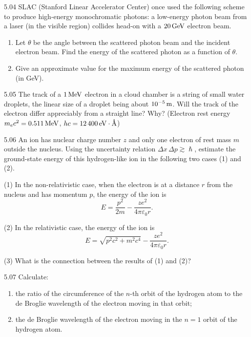 \begin{problem}{5.04}
SLAC (Stanford Linear Accelerator Center) once used the following scheme to produce high-energy monochromatic photons: a low-energy photon beam from a laser (in the visible region) collides head-on with a $20\,\mathrm{GeV}$ electron beam.
\begin{enumerate}[label=(\arabic*),leftmargin=2.2em,itemsep=1pt,topsep=2pt]
\item Let $\theta$ be the angle between the scattered photon beam and the incident electron beam. Find the energy of the scattered photon as a function of $\theta$.
\item Give an approximate value for the maximum energy of the scattered photon (in GeV).
\end{enumerate}
\end{problem}

\begin{problem}{5.05}
The track of a $1\,\mathrm{MeV}$ electron in a cloud chamber is a string of small water droplets, the linear size of a droplet being about $10^{-5}\,\mathrm{m}$. Will the track of the electron differ appreciably from a straight line? Why? (Electron rest energy $m_ec^2 = 0.511\,\mathrm{MeV}$, $hc = 12\,400\,\mathrm{eV}\cdot\text{\AA}$)
\end{problem}

\begin{problem}{5.06}
An ion has nuclear charge number $z$ and only one electron of rest mass $m$ outside the nucleus. Using the uncertainty relation $\Delta x\,\Delta p \gtrsim \hslash$, estimate the ground-state energy of this hydrogen-like ion in the following two cases (1) and (2).

(1) In the non-relativistic case, when the electron is at a distance $r$ from the nucleus and has momentum $p$, the energy of the ion is
\[
E = \frac{p^2}{2m} - \frac{ze^2}{4\pi\varepsilon_0 r}.
\]

(2) In the relativistic case, the energy of the ion is
\[
E = \sqrt{p^2c^2 + m^2c^4} - \frac{ze^2}{4\pi\varepsilon_0 r}.
\]

(3) What is the connection between the results of (1) and (2)?
\end{problem}

\begin{problem}{5.07}
Calculate:
\begin{enumerate}[label=(\arabic*),leftmargin=2.2em,itemsep=1pt,topsep=2pt]
\item the ratio of the circumference of the $n$-th orbit of the hydrogen atom to the de Broglie wavelength of the electron moving in that orbit;
\item the de Broglie wavelength of the electron moving in the $n=1$ orbit of the hydrogen atom.
\end{enumerate}
\end{problem}

